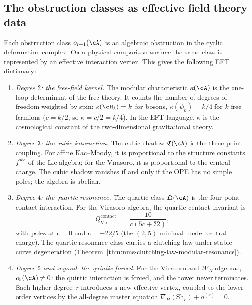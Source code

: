 \subsection{The obstruction classes as effective field theory data}
\label{subsec:thqg-intro-eft-interpretation}

Each obstruction class $o_{r+1}(\cA)$ is an algebraic obstruction in
the cyclic deformation complex. On a physical comparison surface the
same class is represented by an effective interaction vertex. This
gives the following EFT dictionary:

\begin{enumerate}[label=\textup{(\roman*)}]
\item \emph{Degree $2$: the free-field kernel.}
 The modular characteristic $\kappa(\cA)$ is the one-loop determinant
 of the free theory. It counts the number of degrees of freedom
 weighted by spin: $\kappa(\cH_k) = k$ for bosons,
 $\kappa(\psi_k) = k/4$ for $k$ free fermions
 ($c = k/2$, so $\kappa = c/2 = k/4$). In the EFT language,
 $\kappa$ is the cosmological constant of the two-dimensional
 gravitational theory.

\item \emph{Degree $3$: the cubic interaction.}
 The cubic shadow $\mathfrak{C}(\cA)$ is the three-point coupling.
 For affine Kac--Moody, it is proportional to the structure constants
 $f^{abc}$ of the Lie algebra; for the Virasoro, it is proportional to
 the central charge. The cubic shadow vanishes if and only if the
 OPE has no simple poles; the algebra is abelian.

\item \emph{Degree $4$: the quartic resonance.}
 The quartic class $\mathfrak{Q}(\cA)$ is the four-point contact
 interaction. For the Virasoro algebra, the quartic contact
 invariant is
 \[
 Q^{\mathrm{contact}}_{\mathrm{Vir}}
 \;=\; \frac{10}{c(5c+22)},
 \]
 with poles at $c = 0$ and $c = -22/5$ (the $(2,5)$ minimal model
 central charge). The quartic resonance class carries a clutching
 law under stable-curve degeneration
 (Theorem~\ref{thm:nms-clutching-law-modular-resonance}).

\item \emph{Degree $5$ and beyond: the quintic forced.}
 For the Virasoro and $\mathcal{W}_N$ algebras, $o_5(\cA) \ne 0$:
 the quintic interaction is forced, and the tower never terminates.
 Each higher degree~$r$ introduces a new effective vertex, coupled to
 the lower-order vertices by the all-degree master equation
 $\nabla_H(\mathrm{Sh}_r) + o^{(r)} = 0$.
\end{enumerate}

